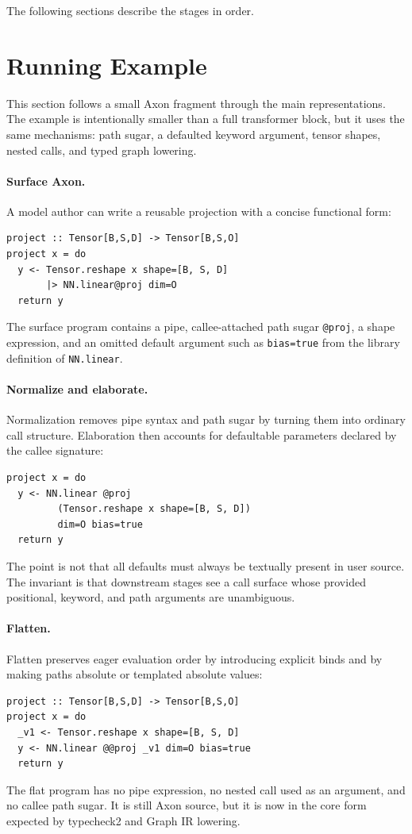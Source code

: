 \documentclass{article}
\newcommand{\code}[1]{\texttt{#1}}
\begin{document}
The following sections describe the stages in order.

\section{Running Example}

This section follows a small Axon fragment through the main representations.
The example is intentionally smaller than a full transformer block, but it
uses the same mechanisms: path sugar, a defaulted keyword argument, tensor
shapes, nested calls, and typed graph lowering.

\paragraph{Surface Axon.}
A model author can write a reusable projection with a concise functional form:
\begin{verbatim}
project :: Tensor[B,S,D] -> Tensor[B,S,O]
project x = do
  y <- Tensor.reshape x shape=[B, S, D]
       |> NN.linear@proj dim=O
  return y
\end{verbatim}
The surface program contains a pipe, callee-attached path sugar
\code{@proj}, a shape expression, and an omitted default argument such as
\code{bias=true} from the library definition of \code{NN.linear}.

\paragraph{Normalize and elaborate.}
Normalization removes pipe syntax and path sugar by turning them into ordinary
call structure.  Elaboration then accounts for defaultable parameters declared
by the callee signature:
\begin{verbatim}
project x = do
  y <- NN.linear @proj
         (Tensor.reshape x shape=[B, S, D])
         dim=O bias=true
  return y
\end{verbatim}
The point is not that all defaults must always be textually present in user
source.  The invariant is that downstream stages see a call surface whose
provided positional, keyword, and path arguments are unambiguous.

\paragraph{Flatten.}
Flatten preserves eager evaluation order by introducing explicit binds and by
making paths absolute or templated absolute values:
\begin{verbatim}
project :: Tensor[B,S,D] -> Tensor[B,S,O]
project x = do
  _v1 <- Tensor.reshape x shape=[B, S, D]
  y <- NN.linear @@proj _v1 dim=O bias=true
  return y
\end{verbatim}
The flat program has no pipe expression, no nested call used as an argument,
and no callee path sugar.  It is still Axon source, but it is now in the core
form expected by typecheck2 and Graph IR lowering.
\end{document}
